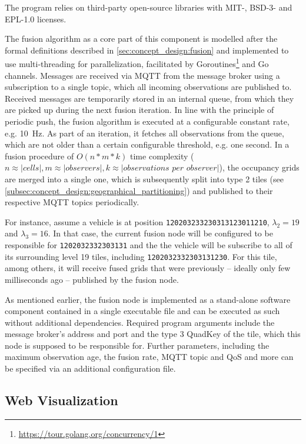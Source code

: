 The program relies on third-party open-source libraries  with MIT-, BSD-3- and EPL-1.0 licenses.
\par
\bigskip

The fusion algorithm as a core part of this component is modelled after the formal definitions described in \cref{sec:concept_design:fusion} and implemented to use multi-threading for parallelization, facilitated by Goroutines\footnote{\url{https://tour.golang.org/concurrency/1}} and Go channels. Messages are received via MQTT from the message broker using a subscription to a single topic, which all incoming observations are published to. Received messages are temporarily stored in an internal queue, from which they are picked up during the next fusion iteration. In line with the principle of periodic push, the fusion algorithm is executed at a configurable constant rate, e.g. \SI{10}{\hertz}. As part of an iteration, it fetches all observations from the queue, which are not older than a certain configurable threshold, e.g. one second. In a fusion procedure of $O(n*m*k)$ time complexity ($n \approx |\textit{cells}|, m \approx |\textit{observers}|, k \approx |\textit{observations per observer}|$), the occupancy grids are merged into a single one, which is subsequently split into type 2 tiles (see \cref{subsec:concept_design:geographical_partitioning}) and published to their respective MQTT topics periodically.

For instance, assume a vehicle is at position \texttt{120203233230313123011210}, $\lambda_2 = 19$ and $\lambda_3 = 16$. In that case, the current fusion node will be configured to be responsible for \texttt{1202032332303131} and the the vehicle will be subscribe to all of its surrounding level 19 tiles, including \texttt{1202032332303131230}. For this tile, among others, it will receive fused grids that were previously – ideally only few milliseconds ago – published by the fusion node.
\par
\bigskip

As mentioned earlier, the fusion node is implemented as a stand-alone software component contained in a single executable file and can be executed as such without additional dependencies. Required program arguments include the message broker's address and port and the type 3 QuadKey of the tile, which this node is supposed to be responsible for. Further parameters, including the maximum observation age, the fusion rate, MQTT topic and QoS and more can be specified via an additional configuration file.

\subsection{Web Visualization}
\label{subsec:implementation:web_visualization}

